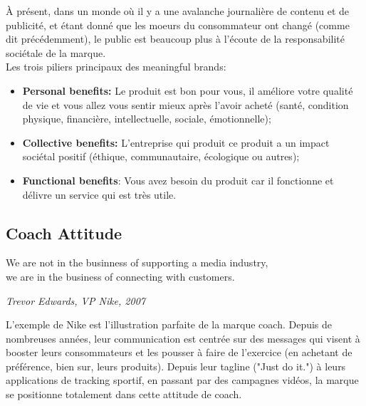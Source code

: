 À présent, dans un monde où il y a une avalanche journalière de contenu et de publicité, et étant donné que les moeurs du consommateur ont changé (comme dit précédemment), le public est beaucoup plus à l'écoute de la responsabilité sociétale de la marque.\\

Les trois piliers principaux des meaningful brands:

\begin{itemize}
    \item \textbf{Personal benefits:} Le produit est bon pour vous, il améliore votre qualité de vie et vous allez vous sentir mieux après l'avoir acheté (santé, condition physique, financière, intellectuelle, sociale, émotionnelle);
    \item \textbf{Collective benefits:} L'entreprise qui produit ce produit a un impact sociétal positif (éthique, communautaire, écologique ou autres);
    \item \textbf{Functional benefits}: Vous avez besoin du produit car il fonctionne et délivre un service qui est très utile.\\
\end{itemize}

\begin{center}
\resizebox{0.95\textwidth}{!}{
    
}
\end{center}

\newpage

\subsection{Coach Attitude}

\epigraph{We are not in the businness of supporting a media industry, \\we are in the business of connecting with customers.}{\textit{Trevor Edwards, VP Nike, 2007}}

\vspace{-0.5cm}

L'exemple de Nike est l'illustration parfaite de la marque coach. Depuis de nombreuses années, leur communication est centrée sur des messages qui visent à booster leurs consommateurs et les pousser à faire de l'exercice (en achetant de préférence, bien sur, leurs produits). Depuis leur tagline ("Just do it.") à leurs applications de tracking sportif, en passant par des campagnes vidéos, la marque se positionne totalement dans cette attitude de coach.\\

